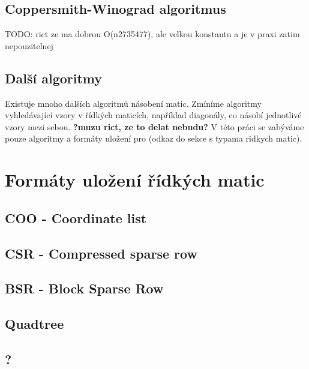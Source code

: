 \documentclass[thesis=B,czech]{FITthesis}[2012/06/26]
\begin{document}
\section{Coppersmith-Winograd algoritmus}

TODO: rict ze ma dobrou O(n2735477), ale velkou konstantu a je v praxi zatim nepouzitelnej

\section{Další algoritmy}

Existuje mnoho dalších algoritmů násobení matic. Zmíníme algoritmy vyhledávající vzory v řídkých maticích, například diagonály, co násobí jednotlivé vzory mezi sebou. \textbf{?muzu rict, ze to delat nebudu?} V této práci se zabýváme pouze algoritmy a formáty uložení pro (odkaz do sekce s typama ridkych matic).



\chapter{Formáty uložení řídkých matic}

\section{COO - Coordinate list}

\section{CSR - Compressed sparse row}

\section{BSR - Block Sparse Row}

\section{Quadtree}

\section{?}
\end{document}

